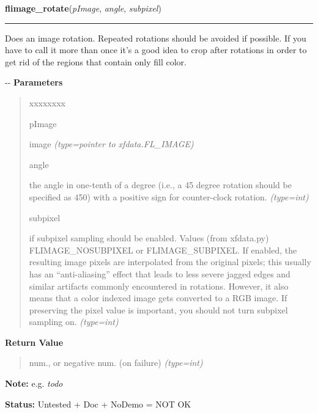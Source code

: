 \hspace{.8\funcindent}\begin{boxedminipage}{\funcwidth}

    \raggedright \textbf{flimage\_rotate}(\textit{pImage}, \textit{angle}, \textit{subpixel})

    \vspace{-1.5ex}

    \rule{\textwidth}{0.5\fboxrule}
\setlength{\parskip}{2ex}

Does an image rotation. Repeated rotations should be avoided if
possible. If you have to call it more than once it's a good idea to crop
after rotations in order to get rid of the regions that contain only fill
color.

-{}-
\setlength{\parskip}{1ex}
      \textbf{Parameters}
      \vspace{-1ex}

      \begin{quote}
        \begin{Ventry}{xxxxxxxx}

          \item[pImage]


image
            {\it (type=pointer to xfdata.FL\_IMAGE)}

          \item[angle]


the angle in one-tenth of a degree (i.e., a 45 degree rotation should
be specified as 450) with a positive sign for counter-clock rotation.
            {\it (type=int)}

          \item[subpixel]


if subpixel sampling should be enabled. Values (from xfdata.py)
FLIMAGE\_NOSUBPIXEL or FLIMAGE\_SUBPIXEL. If enabled, the resulting image
pixels are interpolated from the original pixels; this usually has an
``anti-aliasing'' effect that leads to less severe jagged edges and
similar artifacts commonly encountered in rotations. However, it also
means that a color indexed image gets converted to a RGB image. If
preserving the pixel value is important, you should not turn subpixel
sampling on.
            {\it (type=int)}

        \end{Ventry}

      \end{quote}

      \textbf{Return Value}
    \vspace{-1ex}

      \begin{quote}

num., or negative num. (on failure)
      {\it (type=int)}

      \end{quote}

\textbf{Note:} 
e.g. \emph{todo}


\textbf{Status:} 
Untested + Doc + NoDemo = NOT OK


    \end{boxedminipage}

